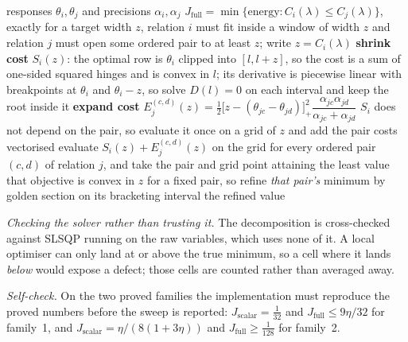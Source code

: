 \documentclass[conference]{IEEEtran}
\theoremstyle{definition}
\begin{document}
\begin{algorithm}[htbp]
\caption{Exact least energy of a capacity-inverting alternative}
\label{alg:fn-jfull}
\begin{algorithmic}[1]
\REQUIRE responses $\theta_{i},\theta_{j}$ and precisions $\alpha_{i},\alpha_{j}$
\ENSURE $J_{\mathrm{full}}=\min\{\text{energy}:C_{i}(\lambda)\le C_{j}(\lambda)\}$, exactly
\STATE for a target width $z$, relation $i$ must fit inside a window of width $z$ and
       relation $j$ must open some ordered pair to at least $z$; write $z=C_{i}(\lambda)$
\STATE \textbf{shrink cost } $S_{i}(z)$: the optimal row is $\theta_{i}$ clipped into
       $[l,l+z]$, so the cost is a sum of one-sided squared hinges and is convex in $l$; its
       derivative is piecewise linear with breakpoints at $\theta_{i}$ and $\theta_{i}-z$,
       so solve $D(l)=0$ on each interval and keep the root inside it
\STATE \textbf{expand cost } $E^{(c,d)}_{j}(z)=\tfrac12\bigl[z-(\theta_{jc}-\theta_{jd})\bigr]_{+}^{2}
       \dfrac{\alpha_{jc}\alpha_{jd}}{\alpha_{jc}+\alpha_{jd}}$
\STATE $S_{i}$ does not depend on the pair, so evaluate it once on a grid of $z$ and add the
       pair costs vectorised
\STATE evaluate $S_{i}(z)+E^{(c,d)}_{j}(z)$ on the grid for every ordered pair $(c,d)$ of
       relation $j$, and take the pair and grid point attaining the least value
\STATE that objective is convex in $z$ for a fixed pair, so refine \emph{that pair's}
       minimum by golden section on its bracketing interval
\RETURN the refined value
\end{algorithmic}
\end{algorithm}

\emph{Checking the solver rather than trusting it.} The decomposition is cross-checked
against SLSQP running on the raw variables, which uses none of it. A local optimiser can only
land at or above the true minimum, so a cell where it lands \emph{below} would expose a
defect; those cells are counted rather than averaged away.

\emph{Self-check.} On the two proved families the implementation must reproduce the proved
numbers before the sweep is reported: $J_{\mathrm{scalar}}=\tfrac1{32}$ and
$J_{\mathrm{full}}\le 9\eta/32$ for family~1, and
$J_{\mathrm{scalar}}=\eta/(8(1+3\eta))$ and $J_{\mathrm{full}}\ge\tfrac1{128}$ for family~2.
\end{document}
